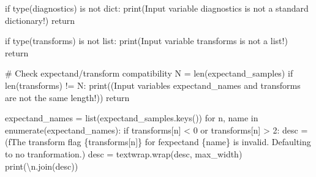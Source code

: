 \documentclass[
  letterpaper,
  DIV=11,
  numbers=noendperiod]{scrartcl}
\newenvironment{Shaded}{\begin{snugshade}}{\end{snugshade}}
\newcommand{\BuiltInTok}[1]{\textcolor[rgb]{0.00,0.23,0.31}{#1}}
\newcommand{\CharTok}[1]{\textcolor[rgb]{0.13,0.47,0.30}{#1}}
\newcommand{\CommentTok}[1]{\textcolor[rgb]{0.37,0.37,0.37}{#1}}
\newcommand{\ControlFlowTok}[1]{\textcolor[rgb]{0.00,0.23,0.31}{#1}}
\newcommand{\DecValTok}[1]{\textcolor[rgb]{0.68,0.00,0.00}{#1}}
\newcommand{\KeywordTok}[1]{\textcolor[rgb]{0.00,0.23,0.31}{#1}}
\newcommand{\NormalTok}[1]{\textcolor[rgb]{0.00,0.23,0.31}{#1}}
\newcommand{\OperatorTok}[1]{\textcolor[rgb]{0.37,0.37,0.37}{#1}}
\newcommand{\SpecialCharTok}[1]{\textcolor[rgb]{0.37,0.37,0.37}{#1}}
\newcommand{\SpecialStringTok}[1]{\textcolor[rgb]{0.13,0.47,0.30}{#1}}
\newcommand{\StringTok}[1]{\textcolor[rgb]{0.13,0.47,0.30}{#1}}
\begin{document}
\begin{Shaded}
\begin{Highlighting}[]
  \ControlFlowTok{if} \BuiltInTok{type}\NormalTok{(diagnostics) }\KeywordTok{is} \KeywordTok{not} \BuiltInTok{dict}\NormalTok{:}
    \BuiltInTok{print}\NormalTok{(}\StringTok{\textquotesingle{}Input variable \textasciigrave{}diagnostics\textasciigrave{} is not a standard dictionary!\textquotesingle{}}\NormalTok{)}
    \ControlFlowTok{return}
  
  \ControlFlowTok{if} \BuiltInTok{type}\NormalTok{(transforms) }\KeywordTok{is} \KeywordTok{not} \BuiltInTok{list}\NormalTok{:}
    \BuiltInTok{print}\NormalTok{(}\StringTok{\textquotesingle{}Input variable \textasciigrave{}transforms\textasciigrave{} is not a list!\textquotesingle{}}\NormalTok{)}
    \ControlFlowTok{return}
  
  \CommentTok{\# Check expectand/transform compatibility}
\NormalTok{  N }\OperatorTok{=} \BuiltInTok{len}\NormalTok{(expectand\_samples)}
  \ControlFlowTok{if} \BuiltInTok{len}\NormalTok{(transforms) }\OperatorTok{!=}\NormalTok{ N:}
    \BuiltInTok{print}\NormalTok{((}\StringTok{\textquotesingle{}Input variables \textasciigrave{}expectand\_names\textasciigrave{} and \textasciigrave{}transforms\textasciigrave{}\textquotesingle{}}
           \StringTok{\textquotesingle{}are not the same length!\textquotesingle{}}\NormalTok{))}
    \ControlFlowTok{return}
  
\NormalTok{  expectand\_names }\OperatorTok{=} \BuiltInTok{list}\NormalTok{(expectand\_samples.keys()) }
  \ControlFlowTok{for}\NormalTok{ n, name }\KeywordTok{in} \BuiltInTok{enumerate}\NormalTok{(expectand\_names):}
    \ControlFlowTok{if}\NormalTok{ transforms[n] }\OperatorTok{\textless{}} \DecValTok{0} \KeywordTok{or}\NormalTok{ transforms[n] }\OperatorTok{\textgreater{}} \DecValTok{2}\NormalTok{:}
\NormalTok{      desc }\OperatorTok{=}\NormalTok{ (}\SpecialStringTok{f\textquotesingle{}The transform flag }\SpecialCharTok{\{}\NormalTok{transforms[n]}\SpecialCharTok{\}}\SpecialStringTok{ for \textquotesingle{}}
              \SpecialStringTok{f\textquotesingle{}expectand }\SpecialCharTok{\{}\NormalTok{name}\SpecialCharTok{\}}\SpecialStringTok{ is invalid.  \textquotesingle{}}
              \StringTok{\textquotesingle{}Defaulting to no tranformation.\textquotesingle{}}\NormalTok{)}
\NormalTok{      desc }\OperatorTok{=}\NormalTok{ textwrap.wrap(desc, max\_width)}
      \BuiltInTok{print}\NormalTok{(}\StringTok{\textquotesingle{}}\CharTok{\textbackslash{}n}\StringTok{\textquotesingle{}}\NormalTok{.join(desc))}
    

\end{Highlighting}
\end{Shaded}
\end{document}
